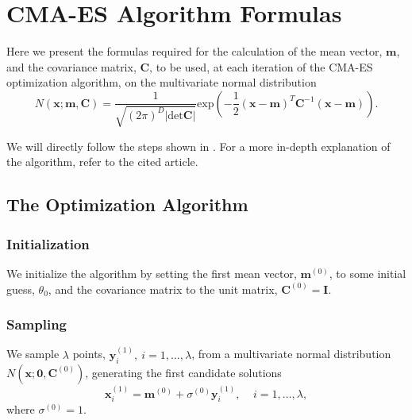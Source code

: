 
\chapter{CMA-ES Algorithm Formulas}
\label{chapter:CMAESAlg}

Here we present the formulas required for the calculation of the mean vector, $\mathbf{m}$, and the covariance matrix, $\mathbf{C}$, to be used, at each iteration of the CMA-ES optimization algorithm, on the multivariate normal distribution
\begin{equation}
N(\mathbf{x;m,C})=\frac{1}{\sqrt{(2\pi)^D|\mathrm{det}\mathbf{C}|}}\mathrm{exp}\left(-\frac{1}{2}(\mathbf{x}-\mathbf{m})^T\mathbf{C}^{-1}(\mathbf{x}-\mathbf{m})\right).
\end{equation}

We will directly follow the steps shown in \citep{DilaoCMA}. For a more in-depth explanation of the algorithm, refer to the cited article.

\section{The Optimization Algorithm}
\subsection{Initialization}
We initialize the algorithm by setting the first mean vector, $\mathbf{m}^{(0)}$, to some initial guess, $\theta_0$, and the covariance matrix to the unit matrix, $\mathbf{C}^{(0)}=\mathbf{I}$.

\subsection{Sampling}
We sample $\lambda$ points, $\mathbf{y}_i^{(1)},\ i=1,\ldots,\lambda$, from a multivariate normal distribution $N(\mathbf{x};\mathbf{0},\mathbf{C}^{(0)})$, generating the first candidate solutions
\begin{equation}
\mathbf{x}^{(1)}_i=\mathbf{m}^{(0)}+\sigma^{(0)}\mathbf{y}^{(1)}_i, \ \ \ \ \ i=1,\ldots,\lambda,
\end{equation} 
\noindent where $\sigma^{(0)}=1$.

